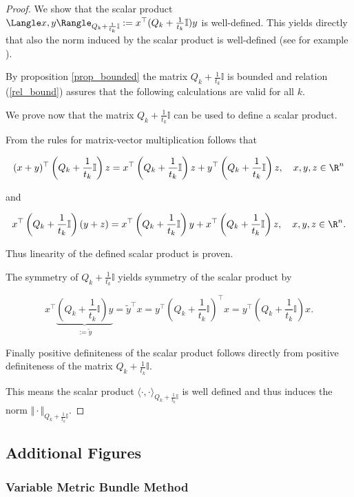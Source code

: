 \begin{proof}
	We show that the scalar product \(\Langle x,y \Rangle_{Q_k+\frac{1}{t_k}\mathbb{I}} := x^{\top} (Q_k+\frac{1}{t_k}\mathbb{I})y\) is well-defined.
	This yields directly that also the norm induced by the scalar product is well-defined (see for example \cite[Corollary 12.6, p.172]{Liesen2015}).
	
	By proposition \ref{prop_bounded} the matrix \(Q_k+\frac{1}{t_k}\mathbb{I}\) is bounded and relation (\ref{rel_bound}) assures that the following calculations are valid for all \(k\).
	
	We prove now that the matrix \(Q_k+\frac{1}{t_k}\mathbb{I}\) can be used to define a scalar product.
	
From the rules for matrix-vector multiplication follows that

\[ (x+y)^{\top}\left(Q_k+\frac{1}{t_k}\mathbb{I}\right)z = x^{\top}\left(Q_k+\frac{1}{t_k}\mathbb{I}\right)z + y^{\top}\left(Q_k+\frac{1}{t_k}\mathbb{I}\right)z, \quad x,y,z \in \R^n\]

and 

\[ x^{\top}\left(Q_k+\frac{1}{t_k}\mathbb{I}\right)(y+z) = x^{\top}\left(Q_k+\frac{1}{t_k}\mathbb{I}\right)y + x^{\top}\left(Q_k+\frac{1}{t_k}\mathbb{I}\right)z, \quad x,y,z \in \R^n.\]

Thus linearity of the defined scalar product is proven.

The symmetry of \(Q_k+\frac{1}{t_k}\mathbb{I}\) yields symmetry of the scalar product by

\[ x^{\top} \underbrace{\left(Q_k+\frac{1}{t_k}\mathbb{I}\right)y}_{:=\tilde{y}} = \tilde{y}^{\top}x = y^{\top}\left(Q_k+\frac{1}{t_k}\mathbb{I}\right)^{\top}x = y^{\top}\left(Q_k+\frac{1}{t_k}\mathbb{I}\right)x.   \]

Finally positive definiteness of the scalar product follows directly from positive definiteness of the matrix \(Q_k+\frac{1}{t_k}\mathbb{I}\).

This means the scalar product \(\langle \cdot,\cdot \rangle_{Q_k+\frac{1}{t_k}\mathbb{I}}\) is well defined and thus induces the norm \(\Vert \cdot \Vert_{Q_k+\frac{1}{t_k}\mathbb{I}}\).
\end{proof}


\subsection{Additional Figures}

\subsubsection{Variable Metric Bundle Method}


